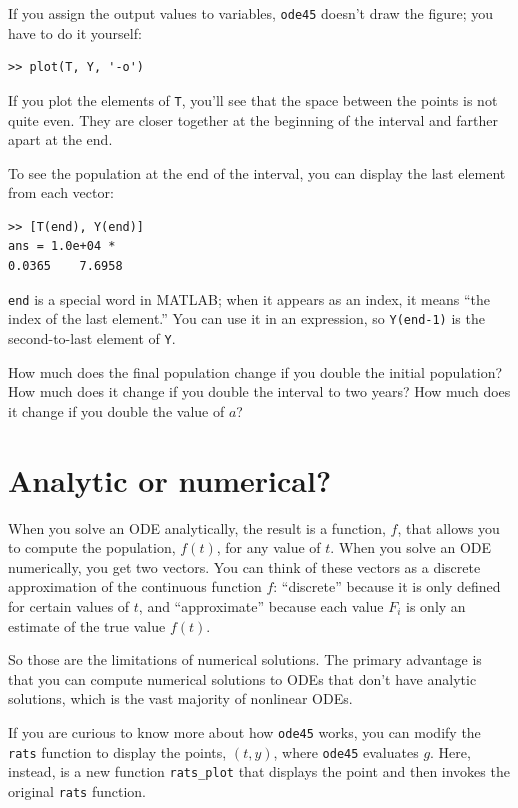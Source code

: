 \documentclass[
]{book}
\begin{document}
If you assign the output values to variables,
{\tt ode45} doesn't draw the figure;
you have to do it yourself:

\begin{verbatim}
>> plot(T, Y, '-o')
\end{verbatim}

If you plot the elements of {\tt T}, you'll see that the
space between the points is not quite even.  They are closer
together at the beginning of the interval and farther apart at the end.

To see the population at the end of the interval, 
you can display the last element from each vector:

\begin{verbatim}
>> [T(end), Y(end)]
ans = 1.0e+04 *
0.0365    7.6958
\end{verbatim}

{\tt end} is a special word in MATLAB; when it appears as an index,
it means ``the index of the last element.''  You can use it in an
expression, so {\tt Y(end-1)} is the second-to-last element of
{\tt Y}.

How much does the final population change if you double the initial
population?  How much does it change if you double the interval
to two years?  How much does it change if you double the value
of $a$?


\section{Analytic or numerical?}

When you solve an ODE analytically, the result is a function, $f$,
that allows you to compute the population, $f(t)$, for any value of
$t$.  When you solve an ODE numerically, you get two vectors.  You can
think of these vectors as a discrete approximation of the continuous
function $f$: ``discrete'' because it is only defined for certain
values of $t$, and ``approximate'' because each value $F_i$
is only an estimate of the true value $f(t)$.

So those are the limitations of numerical solutions.  The primary
advantage is that you can compute numerical solutions to ODEs that
don't have analytic solutions, which is the vast majority
of nonlinear ODEs.

If you are curious to know more about how {\tt ode45} works, you
can modify the {\tt rats} function to display the points, $(t, y)$, where
{\tt ode45} evaluates $g$.  
Here, instead, is a new function
{\tt rats\_plot}
that displays the point and then invokes the original {\tt rats} function.
\end{document}

